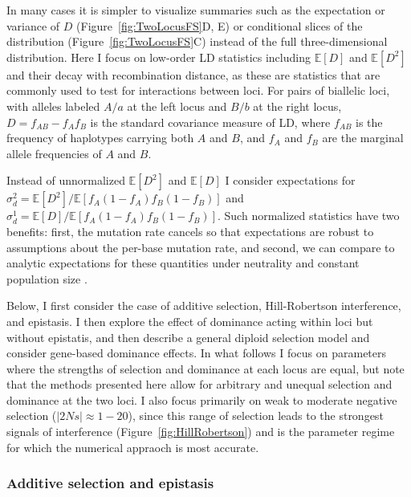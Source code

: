 \documentclass[]{article}
\newcommand{\E}{\mathbb{E}}
\begin{document}
In many cases it is simpler to visualize summaries such as the expectation or
variance of \(D\) (Figure~\ref{fig:TwoLocusFS}D, E) or conditional slices of the
distribution (Figure~\ref{fig:TwoLocusFS}C) instead of the full
three-dimensional distribution. Here I focus on low-order LD statistics
including \(\E[D]\) and \(\E[D^2]\) and their decay with recombination
distance, as these are statistics that are commonly used to test for
interactions between loci. For pairs of biallelic loci, with alleles labeled
\(A/a\) at the left locus and \(B/b\) at the right locus, \(D=f_{AB}-f_A f_B\)
is the standard covariance measure of LD, where \(f_{AB}\) is the frequency of
haplotypes carrying both \(A\) and \(B\), and \(f_A\) and \(f_B\) are the
marginal allele frequencies of \(A\) and \(B\).

Instead of unnormalized \(\E[D^2]\) and \(\E[D]\) I consider expectations for
\(\sigma_d^2 = \E[D^2]/\E[f_A(1-f_A)f_B(1-f_B)]\) and \(\sigma_d^1 =
\E[D]/\E[f_A(1-f_A)f_B(1-f_B)]\).  Such normalized statistics have two
benefits: first, the mutation rate cancels so that expectations are robust to
assumptions about the per-base mutation rate, and second, we can compare to
analytic expectations for these quantities under neutrality and constant
population size \citep{Ohta1971-yd}.

Below, I first consider the case of additive selection, Hill-Robertson
interference, and epistasis. I then explore the effect of dominance acting
within loci but without epistatis, and then describe a general diploid
selection model and consider gene-based dominance effects. In what follows I
focus on parameters where the strengths of selection and dominance at each
locus are equal, but note that the methods presented here allow for arbitrary
and unequal selection and dominance at the two loci. I also focus primarily on
weak to moderate negative selection (\(|2Ns| \approx 1 - 20\)), since this
range of selection leads to the strongest signals of interference
(Figure~\ref{fig:HillRobertson}) and is the parameter regime for which the
numerical appraoch is most accurate.

\subsubsection{Additive selection and epistasis}
\label{sec:additive-selection}
\end{document}
